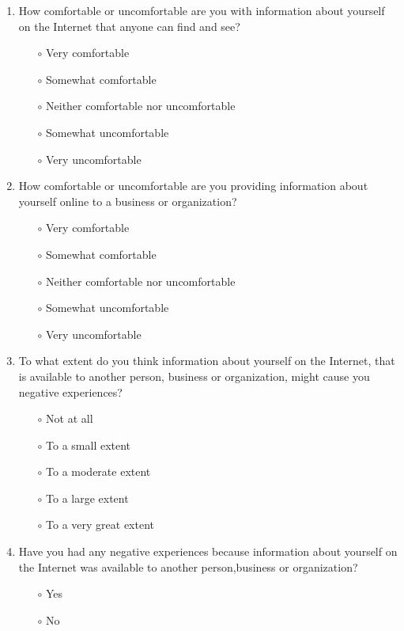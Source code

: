 \begin{enumerate}
\item How comfortable or uncomfortable are you with information about yourself on the Internet that anyone can find and see?

\begin{itemize}
\item[$\circ$] Very comfortable
\item[$\circ$] Somewhat comfortable
\item[$\circ$] Neither comfortable nor uncomfortable
\item[$\circ$] Somewhat uncomfortable
\item[$\circ$] Very uncomfortable
\end{itemize}

\item How comfortable or uncomfortable are you providing information about yourself online to a business or organization?

\begin{itemize}
\item[$\circ$] Very comfortable
\item[$\circ$] Somewhat comfortable
\item[$\circ$] Neither comfortable nor uncomfortable
\item[$\circ$] Somewhat uncomfortable
\item[$\circ$] Very uncomfortable
\end{itemize}

\item To what extent do you think information about yourself on the Internet, that is available to another person, business or organization, might cause you negative experiences?

\begin{itemize}
\item[$\circ$] Not at all
\item[$\circ$] To a small extent
\item[$\circ$] To a moderate extent
\item[$\circ$] To a large extent
\item[$\circ$] To a very great extent
\end{itemize}

\item Have you had any negative experiences because information about yourself on the Internet was available to another person,business or organization?

\begin{itemize}
\item[$\circ$] Yes
\item[$\circ$] No
\end{itemize}


\end{enumerate}
